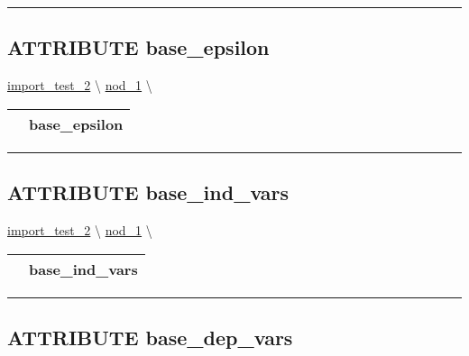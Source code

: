 \par


\rule{\linewidth}{0.5pt}
\subsection*{\textsf{\colorbox{headtoc}{\color{white} ATTRIBUTE}
base\_epsilon}}

\hypertarget{ecldoc:constants.base_epsilon}{}
\hspace{0pt} \hyperlink{ecldoc:import_test_2}{import_test_2} \textbackslash 
\hspace{0pt} \hyperlink{ecldoc:Constants}{nod_1} \textbackslash 

{\renewcommand{\arraystretch}{1.5}
\begin{tabularx}{\textwidth}{|>{\raggedright\arraybackslash}l|X|}
\hline
\hspace{0pt}\mytexttt{\color{red} } & \textbf{base\_epsilon} \\
\hline
\end{tabularx}
}

\par


\rule{\linewidth}{0.5pt}
\subsection*{\textsf{\colorbox{headtoc}{\color{white} ATTRIBUTE}
base\_ind\_vars}}

\hypertarget{ecldoc:constants.base_ind_vars}{}
\hspace{0pt} \hyperlink{ecldoc:import_test_2}{import_test_2} \textbackslash 
\hspace{0pt} \hyperlink{ecldoc:Constants}{nod_1} \textbackslash 

{\renewcommand{\arraystretch}{1.5}
\begin{tabularx}{\textwidth}{|>{\raggedright\arraybackslash}l|X|}
\hline
\hspace{0pt}\mytexttt{\color{red} } & \textbf{base\_ind\_vars} \\
\hline
\end{tabularx}
}

\par


\rule{\linewidth}{0.5pt}
\subsection*{\textsf{\colorbox{headtoc}{\color{white} ATTRIBUTE}
base\_dep\_vars}}

